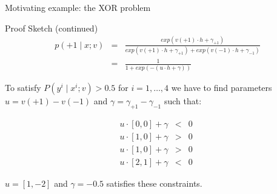\begin{frame}{Motivating example: the XOR problem}
\begin{block}{Proof Sketch (continued)}
\begin{eqnarray*}
p(+1 \mid x; v) &=& \frac{exp(v(+1) \cdot h  + \gamma_{+1})}{exp(v(+1) \cdot h  + \gamma_{+1}) + exp(v(-1) \cdot h + \gamma_{-1})} \\
&=& \frac{1}{1 + exp(-(u \cdot h + \gamma))}
\end{eqnarray*}

\pause
To satisfy $P(y^i \mid x^i; v) > 0.5$ for $i = 1,\ldots,4$
we have to find parameters $u = v(+1) - v(-1)$ and $\gamma = \gamma_{+1} - \gamma_{-1}$
such that:

\begin{eqnarray*}
u \cdot [0,0] + \gamma &<& 0 \\
u \cdot [1,0] + \gamma &>& 0 \\
u \cdot [1,0] + \gamma &>& 0 \\
u \cdot [2,1] + \gamma &<& 0 \end{eqnarray*}

$u = [1, -2]$ and $\gamma = -0.5$ satisfies these constraints.
\end{block}
\end{frame}




 
